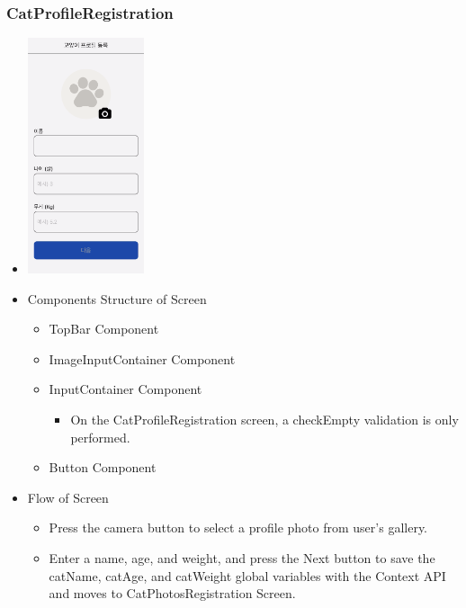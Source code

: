 \documentclass[conference]{IEEEtran}
\begin{document}
\subsubsection{CatProfileRegistration}
\begin{itemize}
    \item[] \includegraphics[width=0.27\textwidth]{img/Screen/10_CatProfile.png}
    \item Components Structure of Screen
    \begin{itemize}
        \item TopBar Component
        \item ImageInputContainer Component
        \item InputContainer Component
        \begin{itemize}
            \item On the CatProfileRegistration screen, a checkEmpty validation is only performed.
        \end{itemize}
        \item Button Component
    \end{itemize}
    \item Flow of Screen
    \begin{itemize}
        \item Press the camera button to select a profile photo from user's gallery.
        \item Enter a name, age, and weight, and press the Next button to save the catName, catAge, and catWeight global variables with the Context API and moves to CatPhotosRegistration Screen.
    \end{itemize}
\end{itemize}
\newpage
\end{document}
